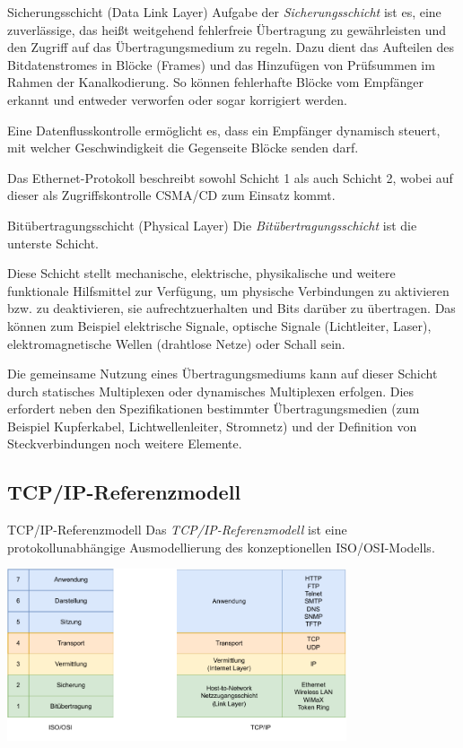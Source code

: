 \begin{defi}{Sicherungsschicht (Data Link Layer)}
    Aufgabe der \emph{Sicherungsschicht} ist es, eine zuverlässige, das heißt weitgehend fehlerfreie Übertragung zu gewährleisten und den Zugriff auf das Übertragungsmedium zu regeln. Dazu dient das Aufteilen des Bitdatenstromes in Blöcke (Frames) und das Hinzufügen von Prüfsummen im Rahmen der Kanalkodierung.
    So können fehlerhafte Blöcke vom Empfänger erkannt und entweder verworfen oder sogar korrigiert werden.

    Eine Datenflusskontrolle ermöglicht es, dass ein Empfänger dynamisch steuert, mit welcher Geschwindigkeit die Gegenseite Blöcke senden darf.

    Das Ethernet-Protokoll beschreibt sowohl Schicht 1 als auch Schicht 2, wobei auf dieser als Zugriffskontrolle CSMA/CD zum Einsatz kommt.
\end{defi}

\begin{defi}{Bitübertragungsschicht (Physical Layer)}
    Die \emph{Bitübertragungsschicht} ist die unterste Schicht.

    Diese Schicht stellt mechanische, elektrische, physikalische und weitere funktionale Hilfsmittel zur Verfügung, um physische Verbindungen zu aktivieren bzw. zu deaktivieren, sie aufrechtzuerhalten und Bits darüber zu übertragen. Das können zum Beispiel elektrische Signale, optische Signale (Lichtleiter, Laser), elektromagnetische Wellen (drahtlose Netze) oder Schall sein.

    Die gemeinsame Nutzung eines Übertragungsmediums kann auf dieser Schicht durch statisches Multiplexen oder dynamisches Multiplexen erfolgen. Dies erfordert neben den Spezifikationen bestimmter Übertragungsmedien (zum Beispiel Kupferkabel, Lichtwellenleiter, Stromnetz) und der Definition von Steckverbindungen noch weitere Elemente.
\end{defi}

\subsection{TCP/IP-Referenzmodell}

\begin{defi}{TCP/IP-Referenzmodell}
    Das \emph{TCP/IP-Referenzmodell} ist eine protokollunabhängige Ausmodellierung des konzeptionellen ISO/OSI-Modells.

    \begin{center}
        \includegraphics[width=0.75\textwidth]{includes/figures/defi_tcp_ip.pdf}
    \end{center}
\end{defi}

